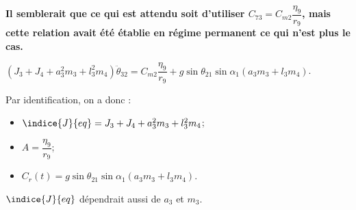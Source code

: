 \begin{corrige}
\textbf{Il semblerait que ce qui est attendu soit d'utiliser ${C_{73}}=C_{m2}\dfrac{\eta_9}{r_9}$, mais cette relation avait été établie en régime permanent ce qui n'est plus le cas. } 


$\left(J_3+J_4  + a_3^2 m_3  +l_3^2 m_4 \right) \ddot{\theta}_{32} =C_{m2}\dfrac{\eta_9}{r_9}+ g  \sin \theta_{21}   \sin \alpha_1 \left( a_3 m_3 + l_3 m_4\right) $.

Par identification, on a donc :
\begin{itemize}
\item $\indice{J}{eq} = J_3+J_4  + a_3^2 m_3  +l_3^2 m_4$;
\item $A  =\dfrac{\eta_9}{r_9}$;
\item $C_r(t)=g  \sin \theta_{21}   \sin \alpha_1 \left( a_3 m_3 + l_3 m_4\right) $.
\end{itemize}

\begin{rem} 
$\indice{J}{eq}$ dépendrait aussi de $a_3$ et $m_3$.
\end{rem}
\end{corrige}
\else
\fi


